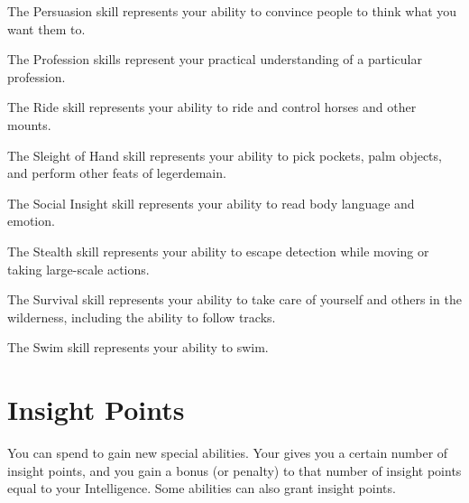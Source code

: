 \begin{raggeditemize}
        \item The Persuasion skill represents your ability to convince people to think what you want them to.
        \item The Profession skills represent your practical understanding of a particular profession.
        \item The Ride skill represents your ability to ride and control horses and other mounts.
        \item The Sleight of Hand skill represents your ability to pick pockets, palm objects, and perform other feats of legerdemain.
        \item The Social Insight skill represents your ability to read body language and emotion.
        \item The Stealth skill represents your ability to escape detection while moving or taking large-scale actions.
        \item The Survival skill represents your ability to take care of yourself and others in the wilderness, including the ability to follow tracks.
        \item The Swim skill represents your ability to swim.
    \end{raggeditemize}

\section{Insight Points}\label{Insight Points}
    You can spend  to gain new special abilities.
    Your  gives you a certain number of insight points, and you gain a bonus (or penalty) to that number of insight points equal to your Intelligence.
    Some abilities can also grant insight points.
    
